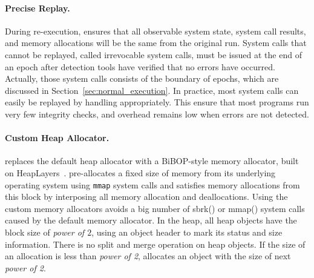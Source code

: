 \paragraph{Precise Replay.}
During re-execution, \doubletake{} ensures that all observable system state, system call results, and memory allocations will be the same from the original run. System calls that cannot be replayed, called irrevocable system calls, must be issued at the end of an epoch after detection tools have verified that no errors have occurred. Actually, those system calls consists of the boundary of epochs, which are discussed in Section~\ref{sec:normal_execution}. In practice, most system calls can easily be replayed by handling appropriately. This ensure that most programs run very few integrity checks, and overhead remains low when errors are not detected.

\paragraph{Custom Heap Allocator.}

\doubletake{} replaces the default heap allocator with a BiBOP-style memory allocator, built on HeapLayers~\cite{heaplayers}. \DoubleTake{} pre-allocates a fixed size of memory from its underlying operating system using \texttt{mmap} system calls and satisfies memory allocations from this block by interposing all memory allocation and deallocations. Using the custom memory allocators avoids a big number of sbrk() or mmap() system calls caused by the default memory allocator. In the heap, all heap objects have the block size of {\it power of $2$}, using an object header to mark its status and size information. There is no split and merge operation on heap objects. If the size of an allocation is less than {\it power of 2}, \DoubleTake{} allocates an object with the size of next {\it power of 2}. 




